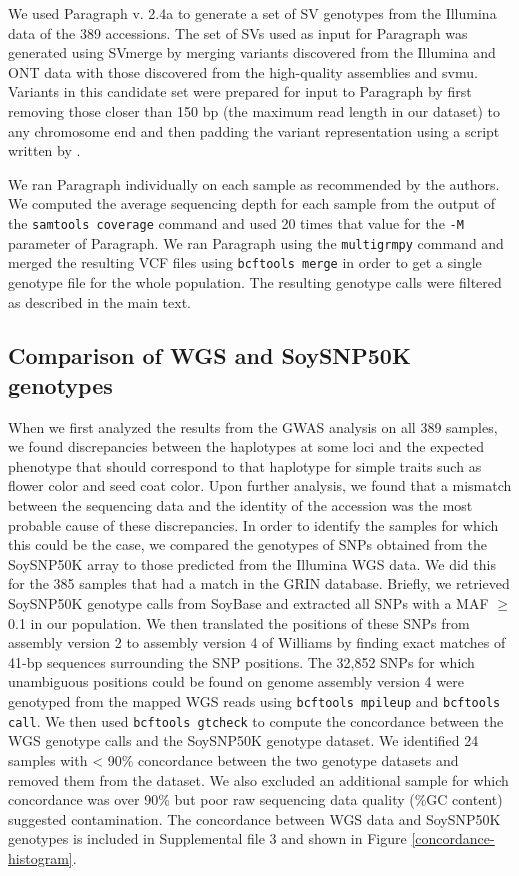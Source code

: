 \documentclass[12pt]{article}
\begin{document}
We used Paragraph v. 2.4a 
to generate a set of SV genotypes from the Illumina data of the 389 accessions.
The set of SVs used as input for Paragraph was generated using SVmerge by
merging variants discovered from the Illumina and ONT data with
those discovered from the high-quality assemblies and svmu.
Variants in this candidate set were prepared for input to Paragraph by first removing
those closer than 150 bp (the maximum read length in our dataset) to any
chromosome end and then padding the variant representation using a script written by
. 

We ran Paragraph individually on each sample as recommended by the authors.  We
computed the average sequencing depth for each sample from the output of the
\texttt{samtools coverage} command and used 20 times that value for the
\texttt{-M} parameter of Paragraph.  We ran Paragraph using the
\texttt{multigrmpy} command and merged the resulting VCF files using
\texttt{bcftools merge} in order to get a  single genotype file for the whole
population. The resulting genotype calls were filtered as described in the main
text.

\subsection*{Comparison of WGS and SoySNP50K genotypes}
\label{annexe-sv-gwas-soysnp50k}
When we first analyzed the results from the GWAS analysis on all 389 samples,
we found discrepancies between the haplotypes at some loci and the expected
phenotype that should correspond to that haplotype for simple traits such as
flower color and seed coat color. Upon further analysis, we found that a
mismatch between the sequencing data and the identity of the accession was the
most probable cause of these discrepancies. In order to identify the samples
for which this could be the case, we compared the genotypes of SNPs obtained
from the SoySNP50K array  to those predicted from the Illumina WGS
data. We did this for the 385 samples that had a match in the GRIN database. Briefly, we
retrieved SoySNP50K genotype calls from SoyBase  and extracted
all SNPs with a MAF $\geq$ 0.1 in our population. We then translated the positions
of these SNPs from assembly version 2 to assembly version 4 of Williams by
finding exact matches of 41-bp sequences surrounding the SNP positions. The
32,852 SNPs for which unambiguous positions could be found on genome assembly
version 4 were genotyped from the mapped WGS reads using \texttt{bcftools
mpileup} and \texttt{bcftools call}. We then used \texttt{bcftools gtcheck} to
compute the concordance between the WGS genotype calls and the
SoySNP50K genotype dataset. We identified 24 samples
with < 90\% concordance between the two genotype datasets and removed them from
the dataset. We also excluded an additional sample for which concordance was over 90\%
but poor raw sequencing data quality (\%GC content) suggested contamination.
The concordance between WGS data and SoySNP50K genotypes is included in
Supplemental file 3 and shown in Figure \ref{concordance-histogram}.
\end{document}
